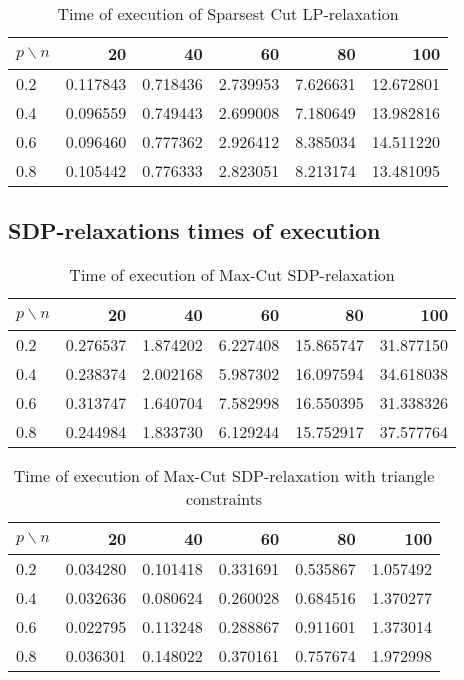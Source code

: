\documentclass[12pt]{article}
\begin{document}
\begin{table}[H]
	\centering
	\begin{tabular}{|lrrrrr|}
		\toprule
		{$p \backslash n$} &       20  &       40  &       60  &       80  &        100 \\
		\midrule
		0.2 &  0.117843 &  0.718436 &  2.739953 &  7.626631 &  12.672801 \\
		0.4 &  0.096559 &  0.749443 &  2.699008 &  7.180649 &  13.982816 \\
		0.6 &  0.096460 &  0.777362 &  2.926412 &  8.385034 &  14.511220 \\
		0.8 &  0.105442 &  0.776333 &  2.823051 &  8.213174 &  13.481095 \\
		\bottomrule
	\end{tabular}
	\caption{Time of execution of Sparsest Cut LP-relaxation}
\end{table}


\subsection{SDP-relaxations times of execution}

\begin{table}[H]
	\centering
	\begin{tabular}{|lrrrrr|}
		\toprule
		{$p \backslash n$} &       20  &       40  &       60  &        80  &        100 \\
		\midrule
		0.2 &  0.276537 &  1.874202 &  6.227408 &  15.865747 &  31.877150 \\
		0.4 &  0.238374 &  2.002168 &  5.987302 &  16.097594 &  34.618038 \\
		0.6 &  0.313747 &  1.640704 &  7.582998 &  16.550395 &  31.338326 \\
		0.8 &  0.244984 &  1.833730 &  6.129244 &  15.752917 &  37.577764 \\
		\bottomrule
	\end{tabular}
	\caption{Time of execution of Max-Cut SDP-relaxation}
\end{table}

\begin{table}[H]
	\centering
	\begin{tabular}{|lrrrrr|}
		\toprule
		{$p \backslash n$} &       20  &       40  &       60  &       80  &       100 \\
		\midrule
		0.2 &  0.034280 &  0.101418 &  0.331691 &  0.535867 &  1.057492 \\
		0.4 &  0.032636 &  0.080624 &  0.260028 &  0.684516 &  1.370277 \\
		0.6 &  0.022795 &  0.113248 &  0.288867 &  0.911601 &  1.373014 \\
		0.8 &  0.036301 &  0.148022 &  0.370161 &  0.757674 &  1.972998 \\
		\bottomrule
	\end{tabular}
	\caption{Time of execution of Max-Cut SDP-relaxation with triangle constraints}
\end{table}
\end{document}
